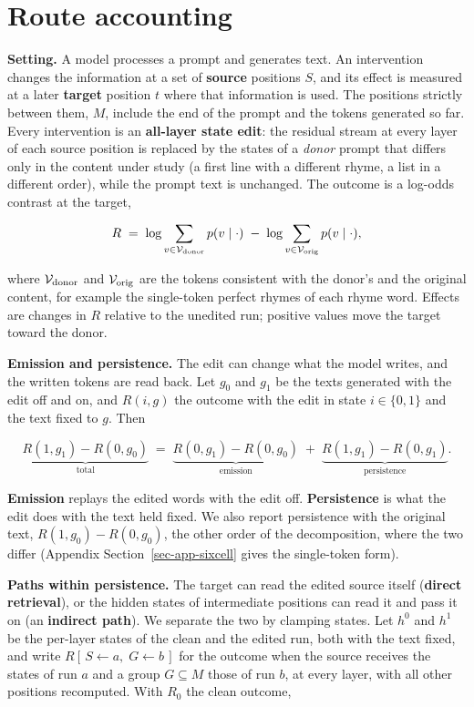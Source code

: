 \documentclass[
]{article}
\begin{document}
\section{Route accounting}\label{sec-method}

\textbf{Setting.} A model processes a prompt and generates text. An
intervention changes the information at a set of \textbf{source}
positions \(S\), and its effect is measured at a later \textbf{target}
position \(t\) where that information is used. The positions strictly
between them, \(M\), include the end of the prompt and the tokens
generated so far. Every intervention is an \textbf{all-layer state
edit}: the residual stream at every layer of each source position is
replaced by the states of a \emph{donor} prompt that differs only in the
content under study (a first line with a different rhyme, a list in a
different order), while the prompt text is unchanged. The outcome is a
log-odds contrast at the target,

\[
R \;=\; \log \sum_{v\in\mathcal V_{\rm donor}} p(v\mid\cdot) \;-\; \log \sum_{v\in\mathcal V_{\rm orig}} p(v\mid\cdot),
\]

where \(\mathcal V_{\rm donor}\) and \(\mathcal V_{\rm orig}\) are the
tokens consistent with the donor's and the original content, for example
the single-token perfect rhymes of each rhyme word. Effects are changes
in \(R\) relative to the unedited run; positive values move the target
toward the donor.

\textbf{Emission and persistence.} The edit can change what the model
writes, and the written tokens are read back. Let \(g_0\) and \(g_1\) be
the texts generated with the edit off and on, and \(R(i,g)\) the outcome
with the edit in state \(i\in\{0,1\}\) and the text fixed to \(g\). Then

\[
\underbrace{R(1,g_1)-R(0,g_0)}_{\text{total}}
\;=\;
\underbrace{R(0,g_1)-R(0,g_0)}_{\text{emission}}
\;+\;
\underbrace{R(1,g_1)-R(0,g_1)}_{\text{persistence}} .
\]

\textbf{Emission} replays the edited words with the edit off.
\textbf{Persistence} is what the edit does with the text held fixed. We
also report persistence with the original text, \(R(1,g_0)-R(0,g_0)\),
the other order of the decomposition, where the two differ (Appendix
Section~\ref{sec-app-sixcell} gives the single-token form).

\textbf{Paths within persistence.} The target can read the edited source
itself (\textbf{direct retrieval}), or the hidden states of intermediate
positions can read it and pass it on (an \textbf{indirect path}). We
separate the two by clamping states. Let \(h^{0}\) and \(h^{1}\) be the
per-layer states of the clean and the edited run, both with the text
fixed, and write \(R[\,S\!\leftarrow\!a,\;G\!\leftarrow\!b\,]\) for the
outcome when the source receives the states of run \(a\) and a group
\(G\subseteq M\) those of run \(b\), at every layer, with all other
positions recomputed. With \(R_0\) the clean outcome,
\end{document}
